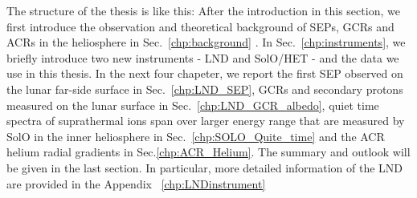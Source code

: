 The structure of the thesis is like this: After the introduction in this section, we first introduce the observation and theoretical background of \acp{SEP}, \acp{GCR} and \acp{ACR} in the heliosphere in Sec.~\ref{chp:background} . In Sec.~\ref{chp:instruments}, we briefly introduce two new instruments - \ac{LND} and \ac{SolO}/\ac{HET} - and the data we use in this thesis. In the next four chapeter, we report the first \ac{SEP} observed on the lunar far-side surface in Sec.~\ref{chp:LND_SEP}, \acp{GCR} and secondary protons measured on the lunar surface in Sec.~\ref{chp:LND_GCR_albedo}, quiet time spectra of suprathermal ions span over larger energy range that are measured by \ac{SolO} in the inner heliosphere in Sec.~\ref{chp:SOLO_Quite_time} and the \ac{ACR} helium radial gradients in Sec.\ref{chp:ACR_Helium}. The summary and outlook will be given in the last section.
In particular, more detailed information of the \ac{LND} are provided in the Appendix ~\ref{chp:LNDinstrument}
















